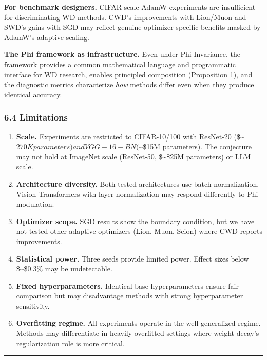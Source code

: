 \documentclass[
]{article}
\begin{document}
\textbf{For benchmark designers.} CIFAR-scale AdamW experiments are
insufficient for discriminating WD methods. CWD's improvements with
Lion/Muon and SWD's gains with SGD may reflect genuine
optimizer-specific benefits masked by AdamW's adaptive scaling.

\textbf{The Phi framework as infrastructure.} Even under Phi Invariance,
the framework provides a common mathematical language and programmatic
interface for WD research, enables principled composition (Proposition
1), and the diagnostic metrics characterize \emph{how} methods differ
even when they produce identical accuracy.

\hypertarget{limitations}{%
\subsubsection{6.4 Limitations}\label{limitations}}

\begin{enumerate}
\def\labelenumi{\arabic{enumi}.}
\item
  \textbf{Scale.} Experiments are restricted to CIFAR-10/100 with
  ResNet-20 (\$\sim\(270K parameters) and VGG-16-BN (\)\sim\$15M
  parameters). The conjecture may not hold at ImageNet scale (ResNet-50,
  \$\sim\$25M parameters) or LLM scale.
\item
  \textbf{Architecture diversity.} Both tested architectures use batch
  normalization. Vision Transformers with layer normalization may
  respond differently to Phi modulation.
\item
  \textbf{Optimizer scope.} SGD results show the boundary condition, but
  we have not tested other adaptive optimizers (Lion, Muon, Scion) where
  CWD reports improvements.
\item
  \textbf{Statistical power.} Three seeds provide limited power. Effect
  sizes below \$\sim\$0.3\% may be undetectable.
\item
  \textbf{Fixed hyperparameters.} Identical base hyperparameters ensure
  fair comparison but may disadvantage methods with strong
  hyperparameter sensitivity.
\item
  \textbf{Overfitting regime.} All experiments operate in the
  well-generalized regime. Methods may differentiate in heavily
  overfitted settings where weight decay's regularization role is more
  critical.
\end{enumerate}

\begin{center}\rule{0.5\linewidth}{0.5pt}\end{center}
\end{document}

